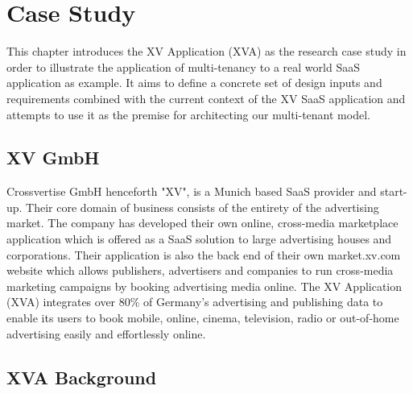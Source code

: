 \chapter{Case Study}

This chapter introduces the XV Application (XVA) as the research case study in order to illustrate the application of multi-tenancy  to a real world SaaS  application as example. It aims to define a concrete set of design inputs and requirements combined with the current context of the XV SaaS application and attempts to use it as the premise for architecting our multi-tenant model. 


\section{XV GmbH}

Crossvertise GmbH henceforth "XV", is a Munich based SaaS provider and start-up. Their core domain of business consists of the entirety of the advertising market. The company has developed their own online, cross-media marketplace application which is offered as a SaaS solution to large advertising houses and corporations. Their application is also the back end of their own market.xv.com website which allows publishers, advertisers and companies to run cross-media marketing campaigns by booking advertising media online. The XV Application (XVA) integrates over 80\% of Germany's advertising and publishing data to enable its users to book mobile, online, cinema, television, radio or out-of-home advertising easily and effortlessly online.

\section{XVA Background}

